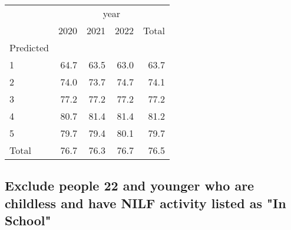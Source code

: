 \documentclass{article}
\begin{document}
\begin{minipage}[b]{.40\textwidth}
	\begin{tabular}{lllll}
		\cline{1-5}
		\multicolumn{1}{c}{} &
		\multicolumn{4}{|c}{year} \\
		\multicolumn{1}{c}{} &
		\multicolumn{1}{|r}{2020} &
		\multicolumn{1}{r}{2021} &
		\multicolumn{1}{r}{2022} &
		\multicolumn{1}{r}{Total} \\
		\cline{1-5}
		\multicolumn{1}{l}{Predicted} &
		\multicolumn{1}{|r}{} &
		\multicolumn{1}{r}{} &
		\multicolumn{1}{r}{} &
		\multicolumn{1}{r}{} \\
		\multicolumn{1}{l}{\hspace{1em}1} &
		\multicolumn{1}{|r}{64.7} &
		\multicolumn{1}{r}{63.5} &
		\multicolumn{1}{r}{63.0} &
		\multicolumn{1}{r}{63.7} \\
		\multicolumn{1}{l}{\hspace{1em}2} &
		\multicolumn{1}{|r}{74.0} &
		\multicolumn{1}{r}{73.7} &
		\multicolumn{1}{r}{74.7} &
		\multicolumn{1}{r}{74.1} \\
		\multicolumn{1}{l}{\hspace{1em}3} &
		\multicolumn{1}{|r}{77.2} &
		\multicolumn{1}{r}{77.2} &
		\multicolumn{1}{r}{77.2} &
		\multicolumn{1}{r}{77.2} \\
		\multicolumn{1}{l}{\hspace{1em}4} &
		\multicolumn{1}{|r}{80.7} &
		\multicolumn{1}{r}{81.4} &
		\multicolumn{1}{r}{81.4} &
		\multicolumn{1}{r}{81.2} \\
		\multicolumn{1}{l}{\hspace{1em}5} &
		\multicolumn{1}{|r}{79.7} &
		\multicolumn{1}{r}{79.4} &
		\multicolumn{1}{r}{80.1} &
		\multicolumn{1}{r}{79.7} \\
		\multicolumn{1}{l}{\hspace{1em}Total} &
		\multicolumn{1}{|r}{76.7} &
		\multicolumn{1}{r}{76.3} &
		\multicolumn{1}{r}{76.7} &
		\multicolumn{1}{r}{76.5} \\
		\cline{1-5}
	\end{tabular}
\end{minipage}


\subsection{Exclude people 22 and younger who are childless and have NILF activity listed as "In School"}
\end{document}
